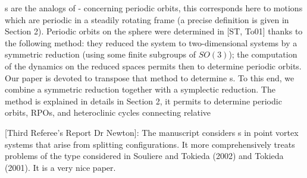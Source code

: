     {\Rpo s} are the analogs of {\reqva}
- concerning periodic orbits, this corresponds here to motions which are
periodic in a steadily rotating frame (a precise definition is given in Section
2). Periodic orbits on the sphere were determined in [ST, To01] thanks to the
following method: they reduced the system to two-dimensional systems by a
symmetric reduction (using some finite subgroups of $SO(3)$); the computation
of the dynamics on the reduced spaces permits then to determine periodic orbits.
Our paper is devoted to transpose that method to determine {\rpo s}. To this end, we combine a symmetric reduction together with a symplectic reduction. 
The method is explained in details in Section 2, it permits
to determine periodic orbits, RPOs, and heteroclinic cycles connecting relative

[Third Referee's Report Dr Newton]:
The manuscript considers {\rpo s} in point vortex systems
that arise from splitting {\reqv} configurations. It more
comprehensively treats problems of the type considered in Souliere and
Tokieda (2002) and Tokieda (2001). It is a very nice paper.

